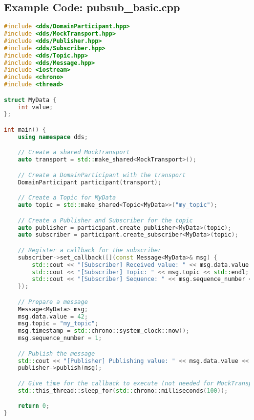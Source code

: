 \documentclass[12pt]{report}
\begin{document}
\subsection{Example Code: pubsub\_basic.cpp}
\begin{lstlisting}[language=C++]
#include <dds/DomainParticipant.hpp>
#include <dds/MockTransport.hpp>
#include <dds/Publisher.hpp>
#include <dds/Subscriber.hpp>
#include <dds/Topic.hpp>
#include <dds/Message.hpp>
#include <iostream>
#include <chrono>
#include <thread>

struct MyData {
    int value;
};

int main() {
    using namespace dds;

    // Create a shared MockTransport
    auto transport = std::make_shared<MockTransport>();

    // Create a DomainParticipant with the transport
    DomainParticipant participant(transport);

    // Create a Topic for MyData
    auto topic = std::make_shared<Topic<MyData>>("my_topic");

    // Create a Publisher and Subscriber for the topic
    auto publisher = participant.create_publisher<MyData>(topic);
    auto subscriber = participant.create_subscriber<MyData>(topic);

    // Register a callback for the subscriber
    subscriber->set_callback([](const Message<MyData>& msg) {
        std::cout << "[Subscriber] Received value: " << msg.data.value << std::endl;
        std::cout << "[Subscriber] Topic: " << msg.topic << std::endl;
        std::cout << "[Subscriber] Sequence: " << msg.sequence_number << std::endl;
    });

    // Prepare a message
    Message<MyData> msg;
    msg.data.value = 42;
    msg.topic = "my_topic";
    msg.timestamp = std::chrono::system_clock::now();
    msg.sequence_number = 1;

    // Publish the message
    std::cout << "[Publisher] Publishing value: " << msg.data.value << std::endl;
    publisher->publish(msg);

    // Give time for the callback to execute (not needed for MockTransport, but good practice)
    std::this_thread::sleep_for(std::chrono::milliseconds(100));

    return 0;
}
\end{lstlisting}
\end{document}
